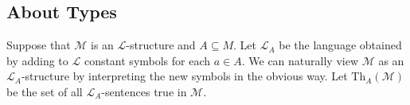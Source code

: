 \documentclass{amsart}
\newtheorem{theorem}{Theorem}[subsection]
\newtheorem{lemma}[theorem]{Lemma}
\newtheorem{proposition}[theorem]{Proposition}
\newtheorem{corollary}[theorem]{Corollary}
\theoremstyle{definition}
\numberwithin{equation}{section}
\begin{document}









\subsection{About Types}
Suppose that $\mathcal{M}$ is an $\mathcal{L}$-structure and $A \subseteq M$.
Let $\mathcal{L}_A$ be the language obtained by adding to $\mathcal{L}$ constant symbols for each $a\in A$.
We can naturally view $\mathcal{M}$ as an $\mathcal{L}_A$-structure by interpreting the new symbols in the obvious way.
Let $\mathrm{Th}_A(\mathcal{M})$ be the set of all $\mathcal{L}_A$-sentences true in $\mathcal{M}$.
\end{document}
